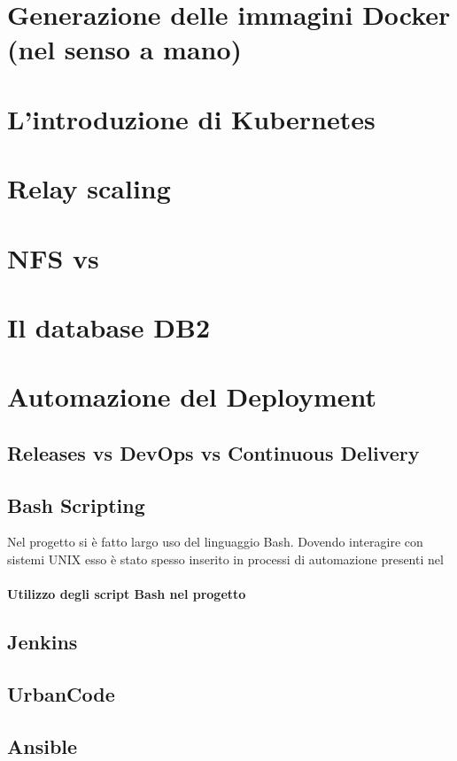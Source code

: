 \section{Generazione delle immagini Docker (nel senso a mano)}

\section{L'introduzione di Kubernetes}

\section{Relay scaling}

\section{NFS vs }

\section{Il database DB2}

\section{Automazione del Deployment}
\subsection{Releases vs DevOps vs Continuous Delivery}
\subsection{Bash Scripting}
Nel progetto si è fatto largo uso del linguaggio Bash. Dovendo interagire con sistemi UNIX esso è stato spesso inserito in processi di automazione presenti nel 
\paragraph{Utilizzo degli script Bash nel progetto}
\subsection{Jenkins}
\subsection{UrbanCode}
\subsection{Ansible}

